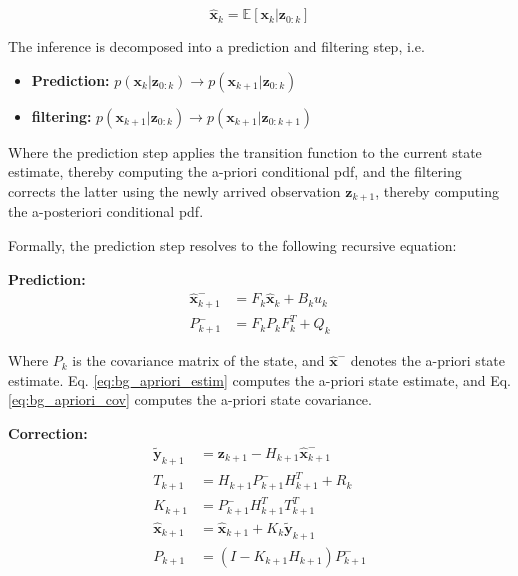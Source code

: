 \begin{equation}
  \label{eq:bg_cond_mean}
  \bm{\hat x}_{k} = \mathbb{E}[\bm{x}_{k}|\bm{z}_{0:k}]
\end{equation}

The inference is decomposed into a prediction and filtering step, i.e.

\begin{itemize}
    \item \textbf{Prediction: } $p(\bm{x}_{k}|\bm{z}_{0:k}) \rightarrow p(\bm{x}_{k+1}|\bm{z}_{0:k})$
    \item \textbf{filtering: } $p(\bm{x}_{k+1}|\bm{z}_{0:k}) \rightarrow p(\bm{x}_{k+1}|\bm{z}_{0:k+1})$
\end{itemize}

Where the prediction step applies the transition function to the current state estimate, thereby computing the a-priori conditional \gls{pdf}, and the filtering corrects the latter using the newly arrived observation $\bm{z}_{k+1}$, thereby computing the a-posteriori conditional \gls{pdf}.

Formally, the prediction step resolves to the following recursive equation:

\textbf{Prediction:}
\begin{align}
  \bm{\hat x}^{-}_{k+1}&=F_{k} \bm{\hat x}_{k} + B_{k}u_{k} \label{eq:bg_apriori_estim}\\
  P_{k+1}^{-}&=F_{k} P_{k} F_{k}^{T} + Q_{k} \label{eq:bg_apriori_cov}
\end{align}

Where $P_{k}$ is the covariance matrix of the state, and $\bm{\hat x}^{-}$ denotes the a-priori state estimate.
Eq. \ref{eq:bg_apriori_estim} computes the a-priori state estimate, and Eq. \ref{eq:bg_apriori_cov} computes the a-priori state covariance.

\textbf{Correction:}
\begin{align}
  \bm{\tilde y}_{k+1} &= \bm{z}_{k+1} - H_{k+1} \bm{\hat x}_{k+1}^{-} \label{eq:bg_innov} \\
  T_{k+1} &= H_{k+1} P_{k+1}^{-} H_{k+1}^{T} + R_{k} \label{eq:bg_innov_cov} \\
  K_{k+1} &= P_{k+1}^{-} H_{k+1}^{T} T_{k+1}^{T} \label{eq:bg_kf_gain}\\
  \bm{\hat x}_{k+1} &= \bm{\hat x}_{k+1} + K_{k} \bm{\tilde y}_{k+1} \label{eq:bg_aposteriori_state_estim}\\
  P_{k+1} &= (I - K_{k+1}H_{k+1}) P_{k+1}^{-} \label{eq:bg_aposteriori_cov_estim}
\end{align}

